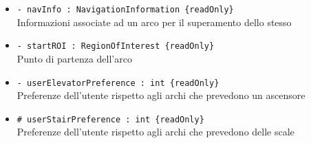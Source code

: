 \documentclass[../DefinizioneDiProdotto.tex]{subfiles}
\begin{document}
\begin{description}
\begin{itemize}
\item \texttt{- navInfo : NavigationInformation \{readOnly\}}\\
Informazioni associate ad un arco per il superamento dello stesso

\item \texttt{- startROI : RegionOfInterest \{readOnly\}}\\
Punto di partenza dell'arco

\item \texttt{- userElevatorPreference : int \{readOnly\}}\\
Preferenze dell'utente rispetto agli archi che prevedono un ascensore

\item \texttt{\# userStairPreference : int \{readOnly\}}\\
Preferenze dell'utente rispetto agli archi che prevedono delle scale


\end{itemize}
\end{description}
\end{document}
